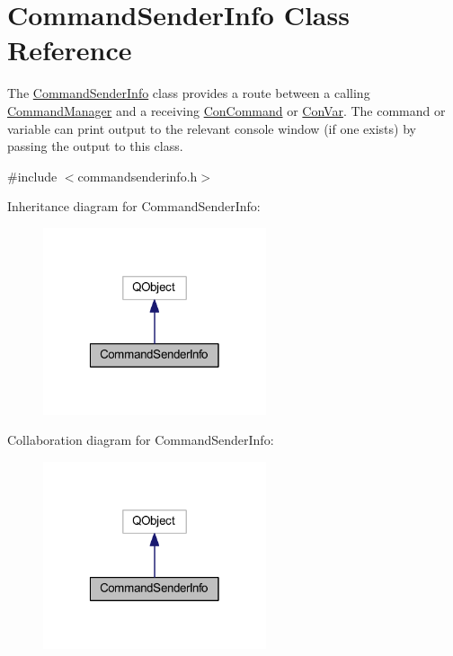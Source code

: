 \hypertarget{class_command_sender_info}{\section{Command\-Sender\-Info Class Reference}
\label{class_command_sender_info}
}


The \hyperlink{class_command_sender_info}{Command\-Sender\-Info} class provides a route between a calling \hyperlink{class_command_manager}{Command\-Manager} and a receiving \hyperlink{class_con_command}{Con\-Command} or \hyperlink{class_con_var}{Con\-Var}. The command or variable can print output to the relevant console window (if one exists) by passing the output to this class.  




{\ttfamily \#include $<$commandsenderinfo.\-h$>$}



Inheritance diagram for Command\-Sender\-Info\-:\nopagebreak
\begin{figure}[H]
\begin{center}
\leavevmode
\includegraphics[width=186pt]{class_command_sender_info__inherit__graph}
\end{center}
\end{figure}


Collaboration diagram for Command\-Sender\-Info\-:\nopagebreak
\begin{figure}[H]
\begin{center}
\leavevmode
\includegraphics[width=186pt]{class_command_sender_info__coll__graph}
\end{center}
\end{figure}
